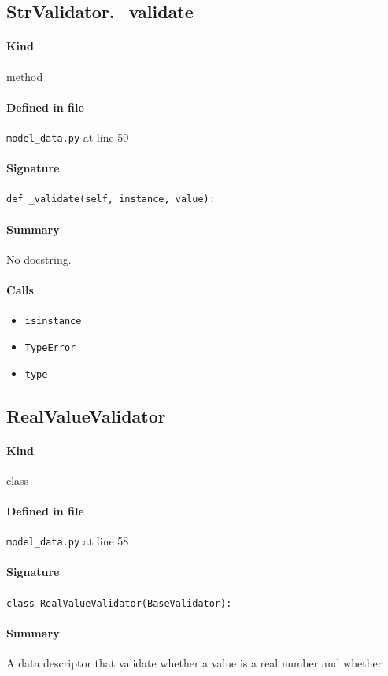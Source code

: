 \documentclass[11pt]{report}
\begin{document}
\subsection{StrValidator.\_validate}
\label{def:model_data.py:StrValidator._validate:L50}
\paragraph{Kind} method
\paragraph{Defined in file} \texttt{model\_data.py} at line 50
\paragraph{Signature} \texttt{def \_validate(self, instance, value):}
\paragraph{Summary} No docstring.
\paragraph{Calls}
\begin{itemize}[leftmargin=*]
  \item \texttt{isinstance}
  \item \texttt{TypeError}
  \item \texttt{type}
\end{itemize}
\subsection{RealValueValidator}
\label{def:model_data.py:RealValueValidator:L58}
\paragraph{Kind} class
\paragraph{Defined in file} \texttt{model\_data.py} at line 58
\paragraph{Signature} \texttt{class RealValueValidator(BaseValidator):}
\paragraph{Summary} A data descriptor that validate whether a value is a real number and whether
\end{document}
